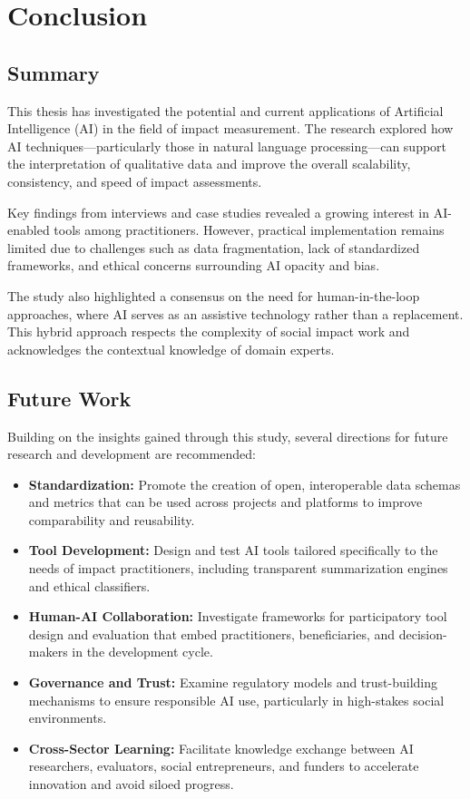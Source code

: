 
\chapter{Conclusion}\label{ch:conclusion}


\section{Summary}\label{sec:summary}

This thesis has investigated the potential and current applications of Artificial Intelligence (AI) in the field of impact measurement.
The research explored how AI techniques—particularly those in natural language processing—can support the interpretation of qualitative data and improve the overall scalability, consistency, and speed of impact assessments.

Key findings from interviews and case studies revealed a growing interest in AI-enabled tools among practitioners.
However, practical implementation remains limited due to challenges such as data fragmentation, lack of standardized frameworks, and ethical concerns surrounding AI opacity and bias.

The study also highlighted a consensus on the need for human-in-the-loop approaches, where AI serves as an assistive technology rather than a replacement.
This hybrid approach respects the complexity of social impact work and acknowledges the contextual knowledge of domain experts.

\section{Future Work}\label{sec:future-work}

Building on the insights gained through this study, several directions for future research and development are recommended:

\begin{itemize}
    \item \textbf{Standardization:} Promote the creation of open, interoperable data schemas and metrics that can be used across projects and platforms to improve comparability and reusability.
    \item \textbf{Tool Development:} Design and test AI tools tailored specifically to the needs of impact practitioners, including transparent summarization engines and ethical classifiers.
    \item \textbf{Human-AI Collaboration:} Investigate frameworks for participatory tool design and evaluation that embed practitioners, beneficiaries, and decision-makers in the development cycle.
    \item \textbf{Governance and Trust:} Examine regulatory models and trust-building mechanisms to ensure responsible AI use, particularly in high-stakes social environments.
    \item \textbf{Cross-Sector Learning:} Facilitate knowledge exchange between AI researchers, evaluators, social entrepreneurs, and funders to accelerate innovation and avoid siloed progress.
\end{itemize}

